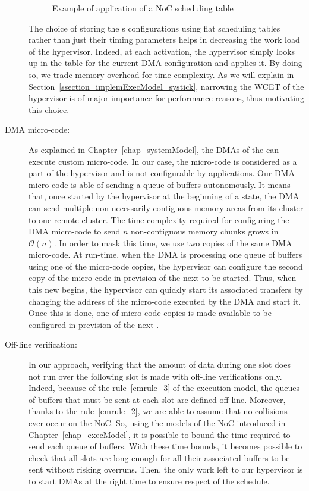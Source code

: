 \documentclass[main.tex]{subfiles}
\begin{document}
\begin{description}
\begin{example}
            \begin{figure}
                \centering
                \scalebox{1}{}
                \caption{Example of application of a NoC scheduling table}
                \label{fig_implemExecModel_exNoCSchedule}
            \end{figure}
        \end{example}
        The choice of storing the \PC{}s configurations using flat scheduling tables rather than just their timing parameters helps in decreasing the work load of the hypervisor. Indeed, at each activation, the hypervisor simply looks up in the table for the current DMA configuration and applies it. By doing so, we trade memory overhead for time complexity. As we will explain in Section~\ref{ssection_implemExecModel_systick}, narrowing the WCET of the hypervisor is of major importance for performance reasons, thus motivating this choice.


    \item[DMA micro-code: ] As explained in Chapter~\ref{chap_systemModel}, the DMAs of the \mppalong can execute custom micro-code. In our case, the micro-code is considered as a part of the hypervisor and is not configurable by applications. Our DMA micro-code is able of sending a queue of buffers autonomously. It means that, once started by the hypervisor at the beginning of a \PC{} state, the DMA can send multiple non-necessarily contiguous memory areas from its cluster to one remote cluster. The time complexity required for configuring the DMA micro-code to send $n$ non-contiguous memory chunks grows in $\mathcal{O}(n)$. In order to mask this time, we use two copies of the same DMA micro-code. At run-time, when the DMA is processing one queue of buffers using one of the micro-code copies, the hypervisor can configure the second copy of the micro-code in prevision of the next \PC{} to be started. Thus, when this new \PC{} begins, the hypervisor can quickly start its associated transfers by changing the address of the micro-code executed by the DMA and start it. Once this is done, one of micro-code copies is made available to be configured in prevision of the next \PC{}.

    \item[Off-line verification: ] In our approach, verifying that the amount of data during one \PC{} slot does not run over the following \PC{} slot is made with off-line verifications only. Indeed, because of the rule~\ref{emrule_3} of the execution model, the queues of buffers that must be sent at each \PC{} slot are defined off-line. Moreover, thanks to the rule~\ref{emrule_2}, we are able to assume that no collisions ever occur on the NoC. So, using the models of the NoC introduced in Chapter~\ref{chap_execModel}, it is possible to bound the time required to send each queue of buffers. With these time bounds, it becomes possible to check that all \PC{} slots are long enough for all their associated buffers to be sent without risking overruns. Then, the only work left to our hypervisor is to start DMAs at the right time to ensure respect of the schedule.


\end{description}
\end{document}
